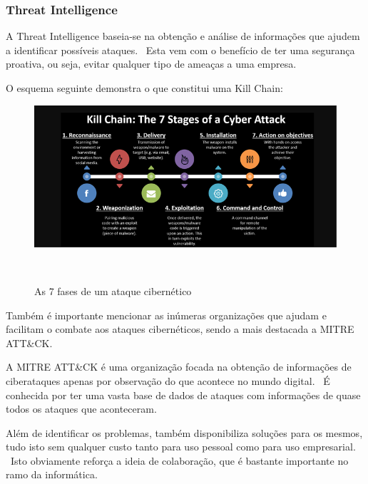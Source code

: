 \documentclass{report}
\begin{document}
\subsubsection{Threat Intelligence}
A Threat Intelligence baseia-se na obtenção e análise de informações que ajudem a identificar possíveis ataques. \ Esta vem com o benefício de ter uma segurança proativa, ou seja, evitar qualquer tipo de ameaças a uma empresa. \par
O esquema seguinte demonstra o que constitui uma Kill Chain:

\begin{figure}[h]
    \center
    \includegraphics[width=350pt]{cyber_kill_chain}
    \caption{As 7 fases de um ataque cibernético}~\cite{kill-chain}
    \label{fig:chainimage}
\end{figure}

Também é importante mencionar as inúmeras organizações que ajudam e facilitam o combate aos ataques cibernéticos, sendo a mais destacada a MITRE ATT\&CK. \bigskip

A MITRE ATT\&CK é uma organização focada na obtenção de informações de ciberataques apenas por observação do que acontece no mundo digital. \ É conhecida por ter uma vasta base de dados de ataques com informações de quase todos os ataques que aconteceram. \par

\newpage

Além de identificar os problemas, também disponibiliza soluções para os mesmos, tudo isto sem qualquer custo tanto para uso pessoal como para uso empresarial. \ Isto obviamente reforça a ideia de colaboração, que é bastante importante no ramo da informática.
\end{document}
